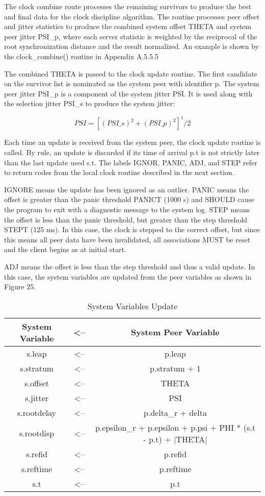 The clock combine route processes the remaining survivors to produce
the best and final data for the clock discipline algorithm.  The
routine processes peer offset and jitter statistics to produce the
combined system offset THETA and system peer jitter PSI\_p, where each
server statistic is weighted by the reciprocal of the root
synchronization distance and the result normalized.  An example is
shown by the clock\_combine() routine in Appendix A.5.5.5

The combined THETA is passed to the clock update routine.  The first
candidate on the survivor list is nominated as the system peer with
identifier p.  The system peer jitter PSI\_p is a component of the
system jitter PSI.  It is used along with the selection jitter PSI\_s
to produce the system jitter:

$$
PSI = [(PSI\_s)^2 + (PSI\_p)^2]^1/2
$$

Each time an update is received from the system peer, the clock
update routine is called.  By rule, an update is discarded if its
time of arrival p.t is not strictly later than the last update used
s.t.  The labels IGNOR, PANIC, ADJ, and STEP refer to return codes
from the local clock routine described in the next section.

IGNORE means the update has been ignored as an outlier.  PANIC means
the offset is greater than the panic threshold PANICT (1000 s) and
SHOULD cause the program to exit with a diagnostic message to the
system log.  STEP means the offset is less than the panic threshold,
but greater than the step threshold STEPT (125 ms).  In this case,
the clock is stepped to the correct offset, but since this means all
peer data have been invalidated, all associations MUST be reset and
the client begins as at initial start.

ADJ means the offset is less than the step threshold and thus a valid
update.  In this case, the system variables are updated from the peer
variables as shown in Figure 25.

\begin{table}[htb]
\center
\begin{tabular}{c | c | c}
System Variable & <-- & System Peer Variable \\
\hline
\hline
s.leap      & <-- & p.leap                    \\
s.stratum   & <-- & p.stratum + 1             \\
s.offset    & <-- & THETA                     \\
s.jitter    & <-- & PSI                       \\
s.rootdelay & <-- & p.delta\_r + delta         \\
s.rootdisp  & <-- & p.epsilon\_r + p.epsilon + p.psi + PHI * (s.t - p.t) + |THETA|  \\
s.refid     & <-- & p.refid                   \\
s.reftime   & <-- & p.reftime                 \\
s.t         & <-- & p.t                       \\
\hline
\end{tabular}
\label{system_variables_update}
\caption{System Variables Update}
\end{table}

